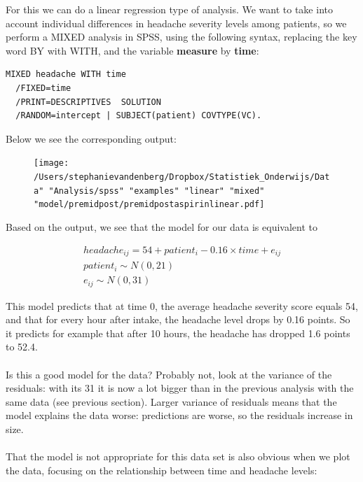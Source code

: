 \documentclass[]{report}\usepackage[]{graphicx}\usepackage[]{color}
\begin{document}
For this we can do a linear regression type of analysis. We want to take into account individual differences in headache severity levels among patients, so we perform a MIXED analysis in SPSS, using the following syntax, replacing the key word BY with WITH, and the variable \textbf{measure} by \textbf{time}:

\begin{verbatim}
MIXED headache WITH time
  /FIXED=time
  /PRINT=DESCRIPTIVES  SOLUTION
  /RANDOM=intercept | SUBJECT(patient) COVTYPE(VC).
\end{verbatim}


Below we see the corresponding output:

\begin{figure}[h]
    \begin{center}
       \texttt{[image: /Users/stephanievandenberg/Dropbox/Statistiek\_Onderwijs/Data" "Analysis/spss" "examples" "linear" "mixed" "model/premidpost/premidpostaspirinlinear.pdf]}
    \end{center}
\end{figure}


Based on the output, we see that the model for our data is equivalent to


\begin{eqnarray}
headache_{ij} = 54 + patient_i - 0.16 \times time + e_{ij} \\
patient_i \sim N(0, 21)\\
e_{ij} \sim N(0, 31)
\end{eqnarray}

This model predicts that at time 0, the average headache severity score equals 54, and that for every hour after intake, the headache level drops by 0.16 points. So it predicts for example that after 10 hours, the headache has dropped 1.6 points to 52.4. 
\\
\\
Is this a good model for the data? Probably not, look at the variance of the residuals: with its 31 it is now a lot bigger than in the previous analysis with the same data (see previous section). Larger variance of residuals means that the model explains the data worse: predictions are worse, so the residuals increase in size. 
\\
\\
That the model is not appropriate for this data set is also obvious when we plot the data, focusing on the relationship between time and headache levels:
\end{document}
